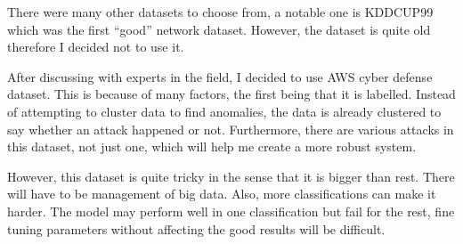 \documentclass[11pt]{article}
\begin{document}
There were many other datasets to choose from, a notable one is KDDCUP99 \cite{bg-dataset-kdd99} which was the first “good” network dataset. However, the dataset is quite old therefore I decided not to use it. 

After discussing with experts in the field, I decided to use AWS cyber defense dataset. This is because of many factors, the first being that it is labelled. Instead of attempting to cluster data to find anomalies, the data is already clustered to say whether an attack happened or not. Furthermore, there are various attacks in this dataset, not just one, which will help me create a more robust system. 

However, this dataset is quite tricky in the sense that it is bigger than rest. There will have to be management of big data. Also, more classifications can make it harder. The model may perform well in one classification but fail for the rest, fine tuning parameters without affecting the good results will be difficult. 






























\newpage


\end{document}
